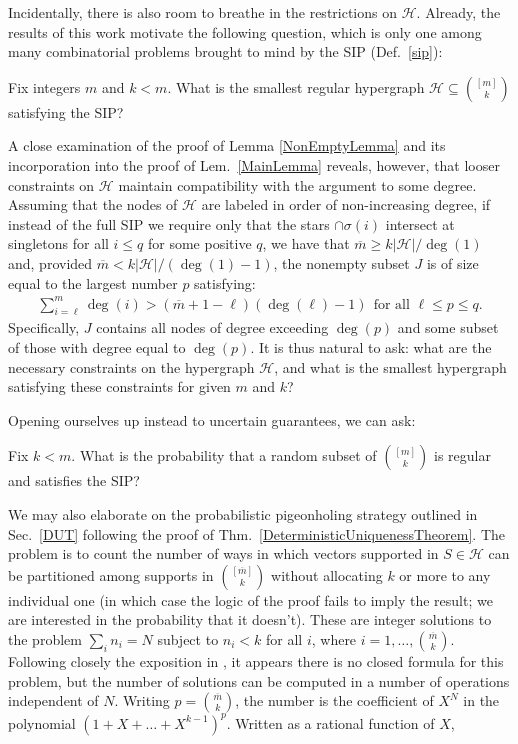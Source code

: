 Incidentally, there is also room to breathe in the restrictions on $\mathcal{H}$. Already, the results of this work motivate the following question, which is only one among many combinatorial problems brought to mind by the SIP (Def.~\ref{sip}):
\begin{question}
Fix integers $m$ and $k < m$. What is the smallest regular hypergraph $\mathcal{H} \subseteq {[m] \choose k}$ satisfying the SIP?
\end{question}

A close examination of the proof of Lemma \ref{NonEmptyLemma} and its incorporation into the proof of Lem.~\ref{MainLemma} reveals, however, that looser constraints on $\mathcal{H}$ maintain compatibility with the argument to some degree. Assuming that the nodes of $\mathcal{H}$ are labeled in order of non-increasing degree, if instead of the full SIP we require only that the stars $\cap \sigma(i)$ intersect at singletons for all $i \leq q$ for some positive $q$, we have that $\overline m \geq k|\mathcal{H}| / \deg(1)$ and, provided $\overline m < k|\mathcal{H}| / (\deg(1) - 1)$, the nonempty subset $J$ is of size equal to the largest number $p$ satisfying:
\begin{align*}
\sum_{i=\ell}^{m} \deg(i) > (\overline m + 1 - \ell) (\deg(\ell) - 1) \ \ \text{for all } \ell \leq p \leq q.
\end{align*}
Specifically, $J$ contains all nodes of degree exceeding $\deg(p)$ and some subset of those with degree equal to $\deg(p)$. It is thus natural to ask: what are the necessary constraints on the hypergraph $\mathcal{H}$, and what is the smallest hypergraph satisfying these constraints for given $m$ and $k$?

Opening ourselves up instead to uncertain guarantees, we can ask:
\begin{question}\label{probofsip}
Fix $k < m$. What is the probability that a random subset of ${[m] \choose k}$ is regular and satisfies the SIP?
\end{question}

We may also elaborate on the probabilistic pigeonholing strategy outlined in Sec.~\ref{DUT} following the proof of Thm.~\ref{DeterministicUniquenessTheorem}. The problem is to count the number of ways in which vectors supported in $S \in \mathcal{H}$ can be partitioned among supports in ${[\overline m] \choose k}$ without allocating $k$ or more to any individual one (in which case the logic of the proof fails to imply the result; we are interested in the probability that it doesn't). These are integer solutions to the problem $\sum_i n_i = N$ subject to $n_i < k$ for all $i$, where $i = 1, \ldots, {\overline m \choose k}$. Following closely the exposition in \cite{stackexchangeanswer}, it appears there is no closed formula for this problem, but the number of solutions can be computed in a number of operations independent of $N$. Writing $p = {\overline m \choose k}$, the number is the coefficient of $X^N$ in the polynomial $(1 + X + \ldots + X^{k-1})^p$. Written as a rational function of $X$, 

